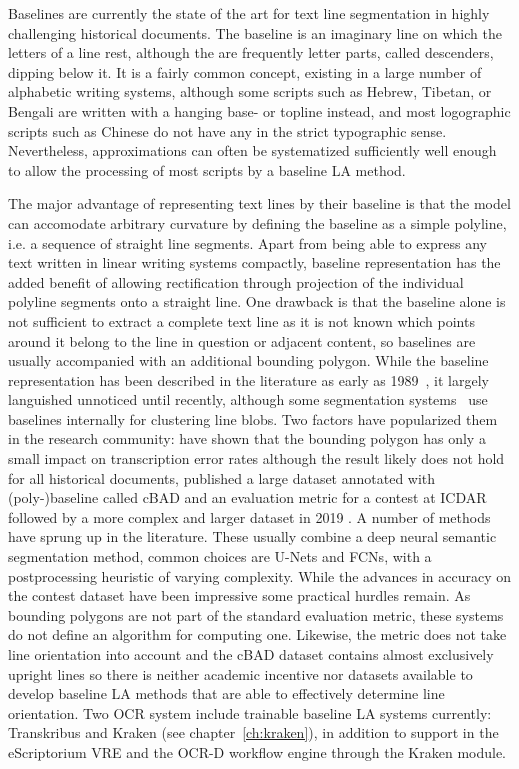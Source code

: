 Baselines are currently the state of the art for text line segmentation in
highly challenging historical documents. The baseline is an imaginary line on
which the letters of a line rest, although the are frequently letter parts,
called descenders, dipping below it. It is a fairly common concept, existing in
a large number of alphabetic writing systems, although some scripts such as
Hebrew, Tibetan, or Bengali are written with a hanging base- or topline
instead, and most logographic scripts such as Chinese do not have any in the
strict typographic sense. Nevertheless, approximations can often be
systematized sufficiently well enough to allow the processing of most scripts
by a baseline LA method.

The major advantage of representing text lines by their baseline is that the
model can accomodate arbitrary curvature by defining the baseline as a simple
polyline, i.e. a sequence of straight line segments. Apart from being able to
express any text written in linear writing systems compactly, baseline
representation has the added benefit of allowing rectification through
projection of the individual polyline segments onto a straight line. One
drawback is that the baseline alone is not sufficient to extract a complete
text line as it is not known which points around it belong to the line in
question or adjacent content, so baselines are usually accompanied with an
additional bounding polygon. While the baseline representation has been
described in the literature as early as 1989~\cite{srihari1989analysis}, it
largely languished unnoticed until recently, although some segmentation
systems~\cite{Breuel03highperformance,smith2007overview} use baselines
internally for clustering line blobs. Two factors have popularized them in
the research community: \cite{romero2015influence} have shown that the bounding
polygon has only a small impact on transcription error rates although the
result likely does not hold for all historical documents, \cite{diem2017cbad}
published a large dataset annotated with (poly-)baseline called cBAD and an
evaluation metric for a contest at ICDAR followed by a more complex and larger
dataset in 2019 \cite{diem_markus_2019_3568023}. A number of methods
\cite{xu2018multi,quiros2018multi,mechi2019text,oliveira2018dhsegment,romain2019semi,gruning2019two,melnikov2020fast}
have sprung up in the literature. These usually combine a deep neural semantic
segmentation method, common choices are U-Nets and FCNs, with a postprocessing
heuristic of varying complexity. While the advances in accuracy on the contest
dataset have been impressive some practical hurdles remain. As bounding
polygons are not part of the standard evaluation metric, these systems do not
define an algorithm for computing one. Likewise, the metric does not take line
orientation into account and the cBAD dataset contains almost exclusively
upright lines so there is neither academic incentive nor datasets available to
develop baseline LA methods that are able to effectively determine line
orientation. Two OCR system include trainable baseline LA systems currently:
Transkribus and Kraken (see chapter~\ref{ch:kraken}), in addition to support in the
eScriptorium VRE and the OCR-D workflow engine through the Kraken module.

